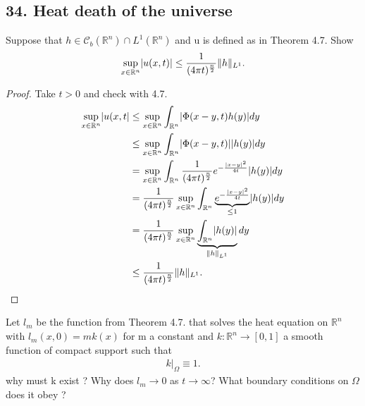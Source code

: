   \subsection*{34. Heat death of the universe}
  \begin{exercise}[a]
   Suppose that $h \in  \mathcal{C}_b(\mathbb{R}^{n} ) \cap L^{1}(\mathbb{R}^{n} ) $ and u is defined as in Theorem 4.7. Show
   \begin{align*}
     \sup_{x \in  \mathbb{R}^{n} } \lvert u(x,t)\rvert \le \frac{1}{(4\pi t)^{\frac{n}{2}} }\|h\|_{L^{1} }
   .\end{align*}
  \end{exercise}
  \begin{proof}
    Take $t>0$ and check  with 4.7.
    \begin{align*}
      \sup_{x \in  \mathbb{R}^{n} } \lvert u(x,t\rvert &\le  \sup_{x \in \mathbb{R}^{n} } \int_{\mathbb{R}^{n} }\lvert\Phi(x-y,t)h(y)\rvert dy\\
                                                &\le  \sup_{x \in \mathbb{R}^{n} } \int_{\mathbb{R}^{n} }\lvert\Phi(x-y,t)\rvert \lvert h(y)\rvert dy\\
                                                &= \sup_{x \in \mathbb{R}^{n} } \int_{\mathbb{R}^{n} } \frac{1}{(4\pi t)^{\frac{n}{2}} }e^{-\frac{\lvert x-y\rvert^2}{4t}}  \lvert h(y)\rvert dy\\
                                                &= \frac{1}{(4\pi t)^{\frac{n}{2}} } \sup_{x \in \mathbb{R}^{n} } \int_{\mathbb{R}^{n} } \underbrace{e^{-\frac{\lvert x-y\rvert^2}{4t}}}_{\le 1}  \lvert h(y)\rvert dy\\
                                                &= \frac{1}{(4\pi t)^{\frac{n}{2}} } \sup_{x \in \mathbb{R}^{n} } \underbrace{\int_{\mathbb{R}^{n} } \lvert h(y)\rvert}_{\|h\|_{L^{1} }} dy\\
                                                &\le  \frac{1}{(4\pi t)^{\frac{n}{2}} } \|h\|_{L^{1}} 
    .\end{align*}
  \end{proof}
  \begin{exercise}[b]
   Let $l_m$ be the function from Theorem 4.7. that solves the heat equation on $\mathbb{R}^{n} $ with $l_m(x,0) = mk(x)$ for m a constant
   and $k : \mathbb{R}^{n} \to [0,1]$ a smooth function of compact support such that 
   \begin{align*}
     k \rvert_{\Omega } \equiv 1
   .\end{align*}
   why must k exist ? Why does $l_m \to 0$ as $t\to \infty$? What boundary conditions on $\Omega $ does it obey ?
  \end{exercise}
